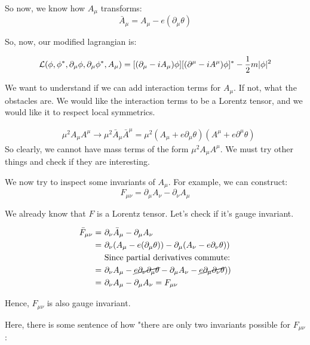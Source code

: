 So now, we know how $A_\mu$ transforms:
\begin{equation}
    \boxed{\bar A_\mu = A_\mu - e(\partial_\mu \theta)}
\end{equation}

So, now, our modified lagrangian is:

\begin{align*}
    \mathcal{L} (\phi, \phi^*, \partial_\mu \phi, \partial_\mu \phi^*, A_\mu) = 
    [(\partial_\mu - i A_\mu) \phi][(\partial^\mu - i A^\mu) \phi]^* - \frac{1}{2} m |\phi|^2
\end{align*}



We want to understand if we can add interaction terms for $A_\mu$. If not,
what the obstacles are. We would like the interaction terms to be a Lorentz
tensor, and we would like it to respect local symmetrics.

\begin{align*}
    &\mu^2 A_\mu A^\mu \to \mu^2 \bar A_\mu \bar A^\mu = \mu^2 (A_\mu + e \partial_\mu \theta) (A^\mu + e \partial^\mu \theta)
\end{align*}
So clearly, we cannot have mass terms of the form $\mu^2 A_\mu A^\mu$. We must
try other things and check if they are interesting.

We now try to inspect some invariants of $A_\mu$.  For example, we can
construct:
$$F_{\mu\nu} = \partial_\mu A_\nu - \partial_\nu A_\mu$$

We already know that $F$ is a Lorentz tensor. Let's check if it's gauge
invariant.

\begin{align*}
    \bar F_{\mu\nu} =~&\partial_\nu \bar A_\mu - \partial_\mu A_\nu \\
    =~&\partial_\nu(A_\mu - e (\partial_\mu \theta)) - \partial_\mu (A_\nu - e \partial_\nu \theta)) \\
      &\text{Since partial derivatives commute:} \\
    =~&\partial_\nu A_\mu - \cancel{e \partial_\nu \partial_\mu \theta} - \partial_\mu A_\nu - \cancel{e \partial_\mu \partial_\nu \theta})) \\
    =~&\partial_\nu A_\mu - \partial_\mu A_\nu = F_{\mu \nu}
\end{align*}

Hence, $F_{\mu \nu}$ is also gauge invariant.

Here, there is some sentence of how "there are only two invariants possible
for $F_{\mu \nu}$:

